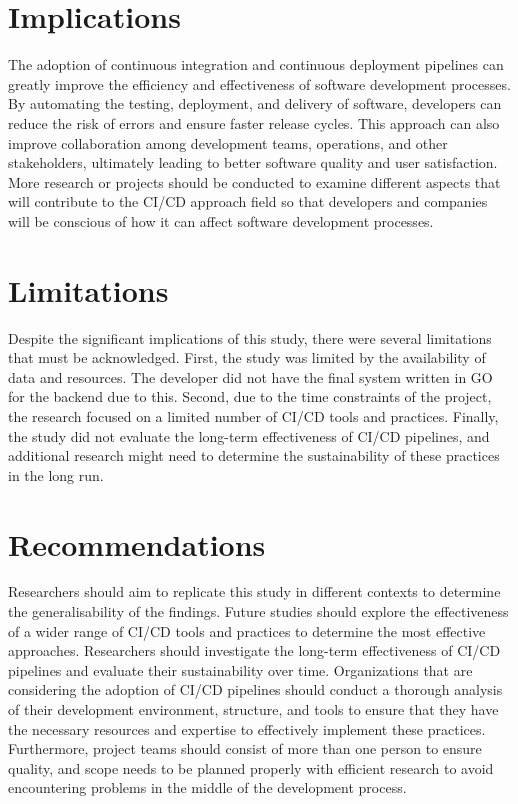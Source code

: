 \section{Implications}
The adoption of continuous integration and continuous deployment pipelines can greatly improve the efficiency and effectiveness of software development processes. By automating the testing, deployment, and delivery of software, developers can reduce the risk of errors and ensure faster release cycles. This approach can also improve collaboration among development teams, operations, and other stakeholders, ultimately leading to better software quality and user satisfaction. More research or projects should be conducted to examine different aspects that will contribute to the CI/CD approach field so that developers and companies will be conscious of how it can affect software development processes.

\section{Limitations}
Despite the significant implications of this study, there were several limitations that must be acknowledged. First, the study was limited by the availability of data and resources. The developer did not have the final system written in GO for the backend due to this. Second, due to the time constraints of the project, the research focused on a limited number of CI/CD tools and practices. Finally, the study did not evaluate the long-term effectiveness of CI/CD pipelines, and additional research might need to determine the sustainability of these practices in the long run.

\section{Recommendations}
Researchers should aim to replicate this study in different contexts to determine the generalisability of the findings. Future studies should explore the effectiveness of a wider range of CI/CD tools and practices to determine the most effective approaches. Researchers should investigate the long-term effectiveness of CI/CD pipelines and evaluate their sustainability over time. Organizations that are considering the adoption of CI/CD pipelines should conduct a thorough analysis of their development environment, structure, and tools to ensure that they have the necessary resources and expertise to effectively implement these practices. Furthermore, project teams should consist of more than one person to ensure quality, and scope needs to be planned properly with efficient research to avoid encountering problems in the middle of the development process.